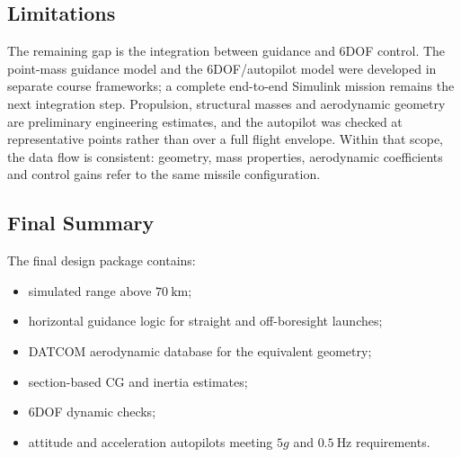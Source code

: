 \subsection{Limitations}

The remaining gap is the integration between guidance and 6DOF control. The point-mass guidance model and the 6DOF/autopilot model were developed in separate course frameworks; a complete end-to-end Simulink mission remains the next integration step. Propulsion, structural masses and aerodynamic geometry are preliminary engineering estimates, and the autopilot was checked at representative points rather than over a full flight envelope. Within that scope, the data flow is consistent: geometry, mass properties, aerodynamic coefficients and control gains refer to the same missile configuration.

\subsection{Final Summary}

The final design package contains:

\begin{itemize}
    \item simulated range above \(70~\text{km}\);
    \item horizontal guidance logic for straight and off-boresight launches;
    \item DATCOM aerodynamic database for the equivalent geometry;
    \item section-based CG and inertia estimates;
    \item 6DOF dynamic checks;
    \item attitude and acceleration autopilots meeting \(5g\) and \(0.5~\text{Hz}\) requirements.
\end{itemize}

